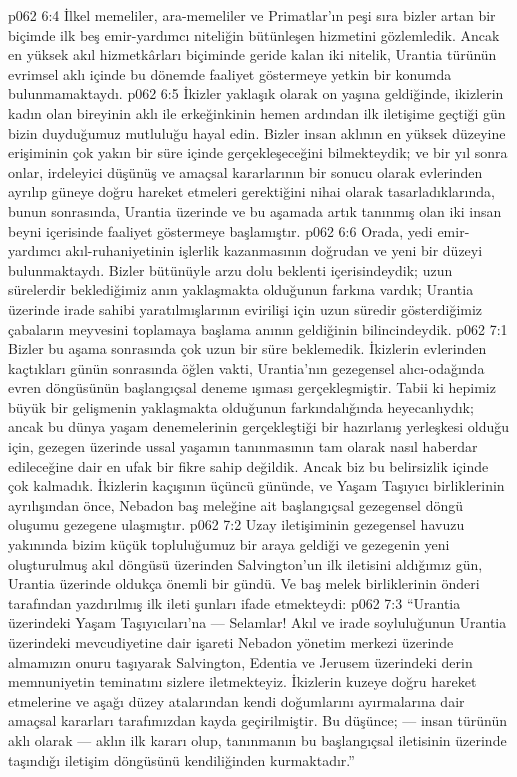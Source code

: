 \vs p062 6:4 İlkel memeliler, ara\hyp{}memeliler ve Primatlar’ın peşi sıra bizler artan bir biçimde ilk beş emir\hyp{}yardımcı niteliğin bütünleşen hizmetini gözlemledik. Ancak en yüksek akıl hizmetkârları biçiminde geride kalan iki nitelik, Urantia türünün evrimsel aklı içinde bu dönemde faaliyet göstermeye yetkin bir konumda bulunmamaktaydı.
\vs p062 6:5 İkizler yaklaşık olarak on yaşına geldiğinde,  ikizlerin kadın olan bireyinin aklı ile erkeğinkinin hemen ardından ilk iletişime geçtiği gün bizin duyduğumuz mutluluğu hayal edin. Bizler insan aklının en yüksek düzeyine erişiminin çok yakın bir süre içinde gerçekleşeceğini bilmekteydik; ve bir yıl sonra onlar, irdeleyici düşünüş ve amaçsal kararlarının bir sonucu olarak evlerinden ayrılıp güneye doğru hareket etmeleri gerektiğini nihai olarak tasarladıklarında, bunun sonrasında, Urantia üzerinde ve bu aşamada artık tanınmış olan iki insan beyni içerisinde faaliyet göstermeye başlamıştır.
\vs p062 6:6 Orada, yedi emir\hyp{}yardımcı akıl\hyp{}ruhaniyetinin işlerlik kazanmasının doğrudan ve yeni bir düzeyi bulunmaktaydı. Bizler bütünüyle arzu dolu beklenti içerisindeydik; uzun sürelerdir beklediğimiz anın yaklaşmakta olduğunun farkına vardık; Urantia üzerinde irade sahibi yaratılmışlarının evirilişi için uzun süredir gösterdiğimiz çabaların meyvesini toplamaya başlama anının geldiğinin bilincindeydik.
\vs p062 7:1 Bizler bu aşama sonrasında çok uzun bir süre beklemedik. İkizlerin evlerinden kaçtıkları günün sonrasında öğlen vakti, Urantia’nın gezegensel alıcı\hyp{}odağında evren döngüsünün başlangıçsal deneme ışıması gerçekleşmiştir. Tabii ki hepimiz büyük bir gelişmenin yaklaşmakta olduğunun farkındalığında heyecanlıydık; ancak bu dünya yaşam denemelerinin gerçekleştiği bir hazırlanış yerleşkesi olduğu için, gezegen üzerinde ussal yaşamın tanınmasının tam olarak nasıl haberdar edileceğine dair en ufak bir fikre sahip değildik. Ancak biz bu belirsizlik içinde çok kalmadık. İkizlerin kaçışının üçüncü gününde, ve Yaşam Taşıyıcı birliklerinin ayrılışından önce, Nebadon baş meleğine ait başlangıçsal gezegensel döngü oluşumu gezegene ulaşmıştır.
\vs p062 7:2 Uzay iletişiminin gezegensel havuzu yakınında bizim küçük topluluğumuz bir araya geldiği ve gezegenin yeni oluşturulmuş akıl döngüsü üzerinden Salvington’un ilk iletisini aldığımız gün, Urantia üzerinde oldukça önemli bir gündü. Ve baş melek birliklerinin önderi tarafından yazdırılmış ilk ileti şunları ifade etmekteydi:
\vs p062 7:3 “Urantia üzerindeki Yaşam Taşıyıcıları’na --- Selamlar! Akıl ve irade soyluluğunun Urantia üzerindeki mevcudiyetine dair işareti Nebadon yönetim merkezi üzerinde almamızın onuru taşıyarak Salvington, Edentia ve Jerusem üzerindeki derin memnuniyetin teminatını sizlere iletmekteyiz. İkizlerin kuzeye doğru hareket etmelerine ve aşağı düzey atalarından kendi doğumlarını ayırmalarına dair amaçsal kararları tarafımızdan kayda geçirilmiştir. Bu düşünce; --- insan türünün aklı olarak --- aklın ilk kararı olup, tanınmanın bu başlangıçsal iletisinin üzerinde taşındığı iletişim döngüsünü kendiliğinden kurmaktadır.”
